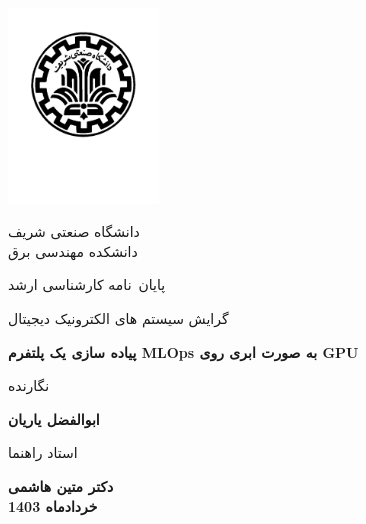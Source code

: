 

\thispagestyle{empty}
{\centering
	\mainjeldfont
	\vspace*{-2.5cm}
	\begin{latin}
		\centering
		\includegraphics[width=4cm]{Sharif_Logo.pdf}
	\end{latin}
	
	\vspace*{-2cm}
	
	{\Large دانشگاه صنعتی شریف \\ \vspace{0mm} \large دانشکده مهندسی برق}
	
	\vspace{1.4cm}
	
	{\large پایان~نامه کارشناسی ارشد\par} 
	{\large  گرایش سیستم های الکترونیک دیجیتال\par}  
	\vspace{1.3cm}
	{\Huge \textbf{پیاده سازی یک پلتفرم MLOps به صورت ابری روی GPU} }\par
	
	\vfil
	{\fieldnamefont نگارنده} \par
	{\Large\textbf{ابوالفضل یاریان}}
	
	\vfil
	{\fieldnamefont استاد راهنما} \par 
	{\Large\textbf{دکتر متین هاشمی}}\\
	
	
	
	\vfil
	{\textbf{خردادماه 1403}}
	
	
	
}